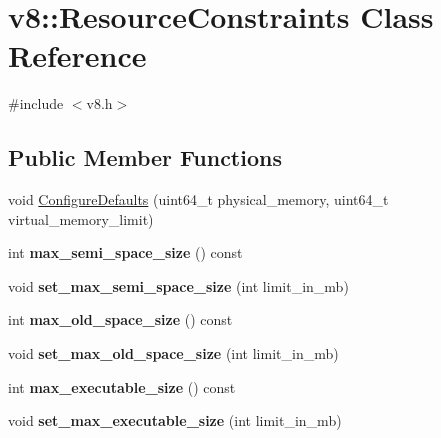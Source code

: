 \hypertarget{classv8_1_1ResourceConstraints}{}\section{v8\+:\+:Resource\+Constraints Class Reference}
\label{classv8_1_1ResourceConstraints}


{\ttfamily \#include $<$v8.\+h$>$}

\subsection*{Public Member Functions}
\begin{DoxyCompactItemize}
\item 
void \hyperlink{classv8_1_1ResourceConstraints_aeeaaee4017e8d5f8f0439af2af2ed3a5}{Configure\+Defaults} (uint64\+\_\+t physical\+\_\+memory, uint64\+\_\+t virtual\+\_\+memory\+\_\+limit)
\item 
int {\bfseries max\+\_\+semi\+\_\+space\+\_\+size} () const \hypertarget{classv8_1_1ResourceConstraints_aeeecbbdb2c7880bf74d5d7fb9bbc52b3}{}\label{classv8_1_1ResourceConstraints_aeeecbbdb2c7880bf74d5d7fb9bbc52b3}

\item 
void {\bfseries set\+\_\+max\+\_\+semi\+\_\+space\+\_\+size} (int limit\+\_\+in\+\_\+mb)\hypertarget{classv8_1_1ResourceConstraints_abee8b1156cbba22f09c4fc553b0a34f3}{}\label{classv8_1_1ResourceConstraints_abee8b1156cbba22f09c4fc553b0a34f3}

\item 
int {\bfseries max\+\_\+old\+\_\+space\+\_\+size} () const \hypertarget{classv8_1_1ResourceConstraints_a72840efdbcfc7bb287c6aea38d0b07b9}{}\label{classv8_1_1ResourceConstraints_a72840efdbcfc7bb287c6aea38d0b07b9}

\item 
void {\bfseries set\+\_\+max\+\_\+old\+\_\+space\+\_\+size} (int limit\+\_\+in\+\_\+mb)\hypertarget{classv8_1_1ResourceConstraints_a54307a3e64cb7e0198b3a137dddd5965}{}\label{classv8_1_1ResourceConstraints_a54307a3e64cb7e0198b3a137dddd5965}

\item 
int {\bfseries max\+\_\+executable\+\_\+size} () const \hypertarget{classv8_1_1ResourceConstraints_a037777e608ed1c22fe294ecef5722036}{}\label{classv8_1_1ResourceConstraints_a037777e608ed1c22fe294ecef5722036}

\item 
void {\bfseries set\+\_\+max\+\_\+executable\+\_\+size} (int limit\+\_\+in\+\_\+mb)\hypertarget{classv8_1_1ResourceConstraints_a2f1ac501d324d6b3d06463c4d6a5c242}{}\label{classv8_1_1ResourceConstraints_a2f1ac501d324d6b3d06463c4d6a5c242}


\end{DoxyCompactItemize}
